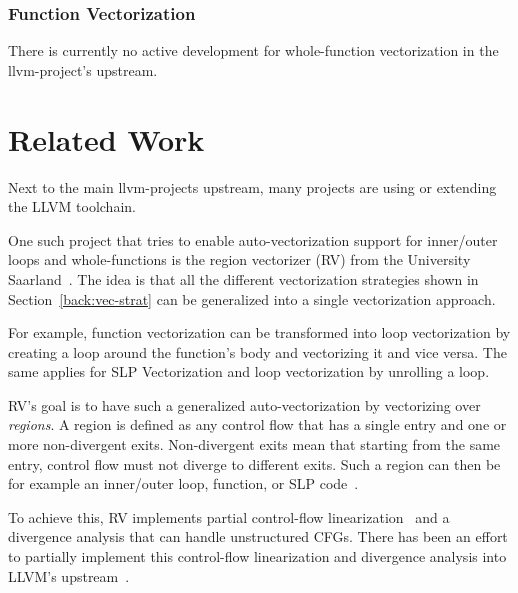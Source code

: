 \documentclass[sigplan,11pt,nonacm]{acmart}
\begin{document}
\subsubsection{Function Vectorization}
There is currently no active development for whole-function vectorization in the
llvm-project's upstream.




\section{Related Work}
\label{sec:relatedwork}
Next to the main llvm-projects upstream, many projects are using or extending the LLVM toolchain.

One such project that tries to enable auto-vectorization support for inner/outer loops and 
whole-functions is the region vectorizer (RV) from the University Saarland~\cite{rv}.
The idea is that all the different vectorization strategies shown in Section~\ref{back:vec-strat}
can be generalized into a single vectorization approach.

For example, function vectorization can be transformed into loop vectorization by creating a loop 
around the function's body and vectorizing it and vice versa. 
The same applies for SLP Vectorization and loop vectorization by unrolling a loop.

RV's goal is to have such a generalized auto-vectorization by vectorizing over \textit{regions}.
A region is defined as any control flow that has a single entry and one or more non-divergent exits.
Non-divergent exits mean that starting from the same entry, control flow must not diverge to different
exits.
Such a region can then be for example an inner/outer loop, function, or SLP code~\cite{rvintro,rvproposal}.

To achieve this, RV implements partial control-flow linearization~\cite{10.1145/3192366.3192413}
and a divergence analysis that can handle unstructured CFGs. There has been an effort to partially
implement this control-flow linearization and divergence analysis into LLVM's 
upstream~\cite{rvproposal,rvproposaldep}.

\end{document}
